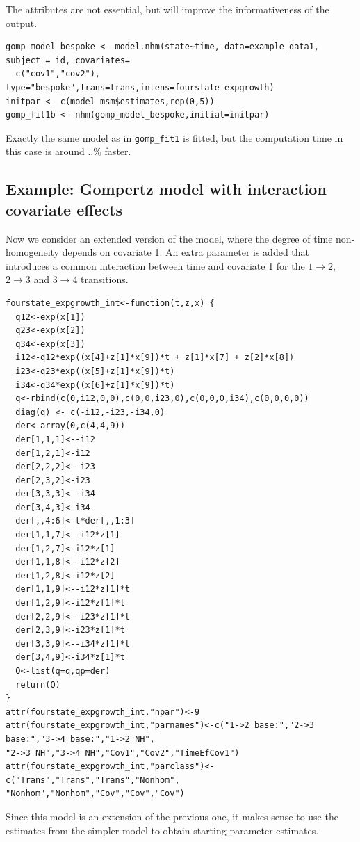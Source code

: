 \documentclass{article}
\numberwithin{equation}{section}
\begin{document}
The attributes are not essential, but will improve the informativeness of the output.

\begin{verbatim}
gomp_model_bespoke <- model.nhm(state~time, data=example_data1, subject = id, covariates=
  c("cov1","cov2"),   type="bespoke",trans=trans,intens=fourstate_expgrowth)
initpar <- c(model_msm$estimates,rep(0,5))
gomp_fit1b <- nhm(gomp_model_bespoke,initial=initpar)
\end{verbatim}
Exactly the same model as in \verb!gomp_fit1! is fitted, but the computation time in this case is around ..\% faster.

\subsection{Example: Gompertz model with interaction covariate effects}

Now we consider an extended version of the model, where the degree of time non-homogeneity depends on covariate 1. An extra parameter is added that introduces a common interaction between time and covariate 1 for the $1 \rightarrow 2$, $2 \rightarrow 3$ and $3 \rightarrow 4$ transitions. 

\begin{verbatim}
fourstate_expgrowth_int<-function(t,z,x) {
  q12<-exp(x[1])
  q23<-exp(x[2])
  q34<-exp(x[3])
  i12<-q12*exp((x[4]+z[1]*x[9])*t + z[1]*x[7] + z[2]*x[8])
  i23<-q23*exp((x[5]+z[1]*x[9])*t)
  i34<-q34*exp((x[6]+z[1]*x[9])*t)
  q<-rbind(c(0,i12,0,0),c(0,0,i23,0),c(0,0,0,i34),c(0,0,0,0))
  diag(q) <- c(-i12,-i23,-i34,0)
  der<-array(0,c(4,4,9))
  der[1,1,1]<--i12
  der[1,2,1]<-i12
  der[2,2,2]<--i23
  der[2,3,2]<-i23
  der[3,3,3]<--i34
  der[3,4,3]<-i34
  der[,,4:6]<-t*der[,,1:3]
  der[1,1,7]<--i12*z[1]
  der[1,2,7]<-i12*z[1]
  der[1,1,8]<--i12*z[2]
  der[1,2,8]<-i12*z[2]
  der[1,1,9]<--i12*z[1]*t
  der[1,2,9]<-i12*z[1]*t
  der[2,2,9]<--i23*z[1]*t
  der[2,3,9]<-i23*z[1]*t
  der[3,3,9]<--i34*z[1]*t
  der[3,4,9]<-i34*z[1]*t
  Q<-list(q=q,qp=der)
  return(Q)
}
attr(fourstate_expgrowth_int,"npar")<-9
attr(fourstate_expgrowth_int,"parnames")<-c("1->2 base:","2->3 base:","3->4 base:","1->2 NH",
"2->3 NH","3->4 NH","Cov1","Cov2","TimeEfCov1")
attr(fourstate_expgrowth_int,"parclass")<-c("Trans","Trans","Trans","Nonhom",
"Nonhom","Nonhom","Cov","Cov","Cov")
\end{verbatim}
Since this model is an extension of the previous one, it makes sense to use the estimates from the simpler model to obtain starting parameter estimates.
\end{document}
